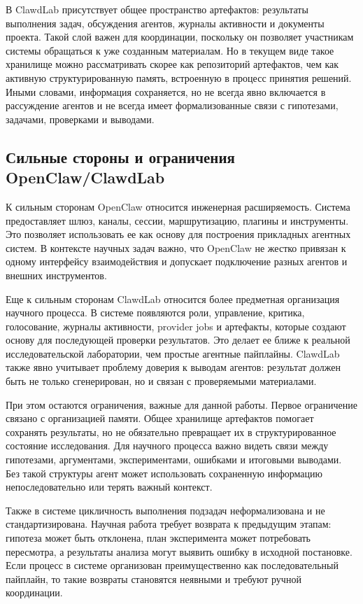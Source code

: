 В ClawdLab присутствует общее пространство артефактов: результаты выполнения задач, обсуждения агентов, журналы активности и документы проекта. Такой слой важен для координации, поскольку он позволяет участникам системы обращаться к уже созданным материалам. Но в текущем виде такое хранилище можно рассматривать скорее как репозиторий артефактов, чем как активную структурированную память, встроенную в процесс принятия решений. Иными словами, информация сохраняется, но не всегда явно включается в рассуждение агентов и не всегда имеет формализованные связи с гипотезами, задачами, проверками и выводами.

\subsection{Сильные стороны и ограничения OpenClaw/ClawdLab}

К сильным сторонам OpenClaw относится инженерная расширяемость. Система предоставляет шлюз, каналы, сессии, маршрутизацию, плагины и инструменты. Это позволяет использовать ее как основу для построения прикладных агентных систем. В контексте научных задач важно, что OpenClaw не жестко привязан к одному интерфейсу взаимодействия и допускает подключение разных агентов и внешних инструментов.

Еще к сильным сторонам ClawdLab относится более предметная организация научного процесса. В системе появляются роли, управление, критика, голосование, журналы активности, provider jobs и артефакты, которые создают основу для последующей проверки результатов. Это делает ее ближе к реальной исследовательской лаборатории, чем простые агентные пайплайны. ClawdLab также явно учитывает проблему доверия к выводам агентов: результат должен быть не только сгенерирован, но и связан с проверяемыми материалами.

При этом остаются ограничения, важные для данной работы. Первое ограничение связано с организацией памяти. Общее хранилище артефактов помогает сохранять результаты, но не обязательно превращает их в структурированное состояние исследования. Для научного процесса важно видеть связи между гипотезами, аргументами, экспериментами, ошибками и итоговыми выводами. Без такой структуры агент может использовать сохраненную информацию непоследовательно или терять важный контекст.

Также в системе цикличность выполнения подзадач неформализована и не стандартизирована. Научная работа требует возврата к предыдущим этапам: гипотеза может быть отклонена, план эксперимента может потребовать пересмотра, а результаты анализа могут выявить ошибку в исходной постановке. Если процесс в системе организован преимущественно как последовательный пайплайн, то такие возвраты становятся неявными и требуют ручной координации.

